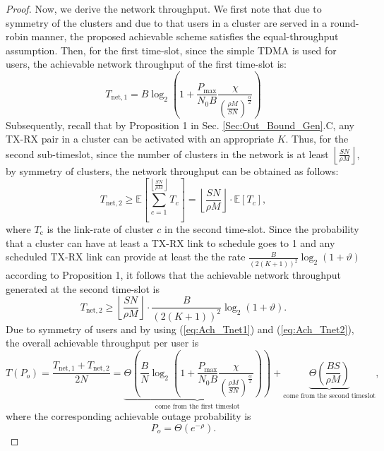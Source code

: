 \documentclass[journal,draftclsnofoot,onecolumn,12pt,twoside]{IEEEtran}
\begin{document}
\begin{proof}
Now, we derive the network throughput. We first note that due to symmetry of the clusters and due to that users in a cluster are served in a round-robin manner, the proposed achievable scheme satisfies the equal-throughput assumption. Then, for the first time-slot, since the simple TDMA is used for users, the achievable network throughput of the first time-slot is:
\begin{equation}\label{eq:Ach_Tnet1}
T_{\text{net},1}=B\log_2\left(1+\frac{P_{\text{max}}}{N_0B}\frac{\chi}{\left(\frac{\rho M}{SN}\right)^\frac{\alpha}{2}}\right)
\end{equation}
Subsequently, recall that by Proposition 1 in Sec. \ref{Sec:Out_Bound_Gen}.C, any TX-RX pair in a cluster can be activated with an appropriate $K$. Thus, for the second sub-timeslot, since the number of clusters in the network is at least $\left\lfloor\frac{SN}{\rho M}\right\rfloor$, by symmetry of clusters, the network throughput can be obtained as follows:
\begin{equation}
T_{\text{net},2}\geq \mathbb{E}\left[\sum_{c=1}^{\left\lfloor\frac{SN}{\rho M}\right\rfloor}T_{c}\right]=\left\lfloor\frac{SN}{\rho M}\right\rfloor\cdot\mathbb{E}\left[T_{c}\right],
\end{equation}
where $T_{\text{c}}$ is the link-rate of cluster $c$ in the second time-slot. Since the probability that a cluster can have at least a TX-RX link to schedule goes to 1 and any scheduled TX-RX link can provide at least the the rate $\frac{B}{(2(K+1))^2}\log_2\left(1+\vartheta\right)$ according to Proposition 1, it follows that the achievable network throughput generated at the second time-slot is
\begin{equation}\label{eq:Ach_Tnet2}
T_{\text{net},2}\geq\left\lfloor\frac{SN}{\rho M}\right\rfloor\cdot\frac{B}{(2(K+1))^2}\log_2\left(1+\vartheta\right).
\end{equation}
Due to symmetry of users and by using (\ref{eq:Ach_Tnet1}) and (\ref{eq:Ach_Tnet2}), the overall achievable throughput per user is
\begin{equation}
T(P_o)=\frac{T_{\text{net},1}+T_{\text{net},2}}{2N}=\underbrace{\Theta\left(\frac{B}{N}\log_2\left(1+\frac{P_{\text{max}}}{N_0B}\frac{\chi}{\left(\frac{\rho M}{SN}\right)^\frac{\alpha}{2}}\right)\right)}_{\text{come from the first timeslot}}+\underbrace{\Theta\left(\frac{BS}{\rho M}\right)}_{\text{come from the second timeslot}},
\end{equation}
where the corresponding achievable outage probability is 
\begin{equation}
P_o= \Theta\left(e^{-\rho}\right).
\end{equation}
\end{proof}
\end{document}
